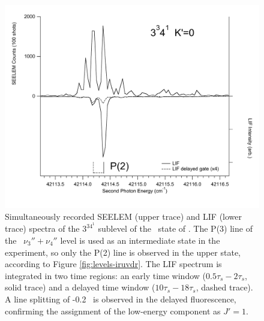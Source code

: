 \begin{figure}
  \caption{Simultaneously recorded SEELEM (upper trace) and LIF (lower
    trace) spectra of the $3^34^1$  sublevel of the \astate\
    state of .  The P(3) line of the \xstate\ $\nu_3'' +
    \nu_4''$ level is used as an intermediate state in the experiment,
    so only the P(2) line is observed in the upper state, according to
    Figure \ref{fig:levels-iruvdr}.  The LIF spectrum is integrated in
    two time regions: an early time window ($0.5\tau_s-2\tau_s$, solid
    trace) and a delayed time window ($10\tau_s-18\tau_s$, dashed
    trace).  A line splitting of -0.2 \rcm\ is observed in the
    delayed fluorescence, confirming the assignment of the low-energy
    component as $J'=1$.}
  \label{fig:3341-p2}
  \centering
  \includegraphics[width=6in]{spectrum-3341-p2-cal.pdf}
\end{figure}














































